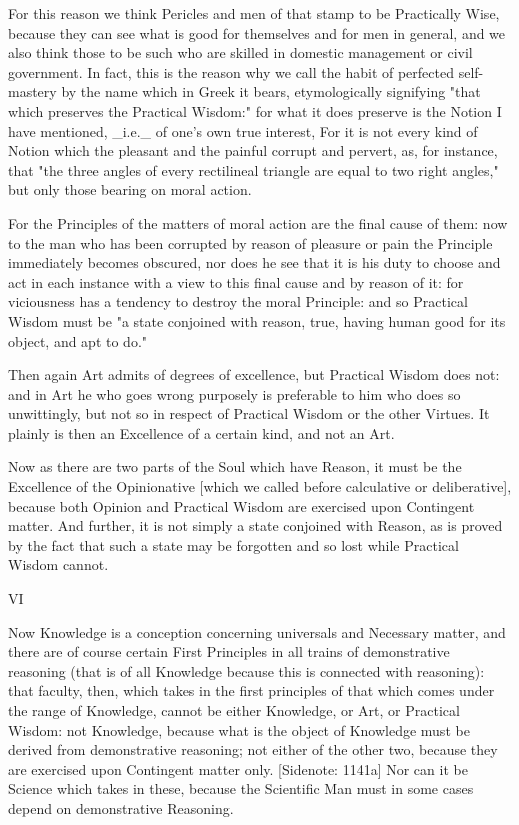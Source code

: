 For this reason we think Pericles and men of that stamp to be
Practically Wise, because they can see what is good for themselves and
for men in general, and we also think those to be such who are skilled
in domestic management or civil government. In fact, this is the reason
why we call the habit of perfected self-mastery by the name which in
Greek it bears, etymologically signifying "that which preserves the
Practical Wisdom:" for what it does preserve is the Notion I have
mentioned, _i.e._ of one's own true interest, For it is not every kind
of Notion which the pleasant and the painful corrupt and pervert, as,
for instance, that "the three angles of every rectilineal triangle are
equal to two right angles," but only those bearing on moral action.

For the Principles of the matters of moral action are the final cause
of them: now to the man who has been corrupted by reason of pleasure or
pain the Principle immediately becomes obscured, nor does he see that it
is his duty to choose and act in each instance with a view to this final
cause and by reason of it: for viciousness has a tendency to destroy the
moral Principle: and so Practical Wisdom must be "a state conjoined with
reason, true, having human good for its object, and apt to do."

Then again Art admits of degrees of excellence, but Practical Wisdom
does not: and in Art he who goes wrong purposely is preferable to him
who does so unwittingly, but not so in respect of Practical Wisdom or
the other Virtues. It plainly is then an Excellence of a certain kind,
and not an Art.

Now as there are two parts of the Soul which have Reason, it must be the
Excellence of the Opinionative [which we called before calculative or
deliberative], because both Opinion and Practical Wisdom are exercised
upon Contingent matter. And further, it is not simply a state conjoined
with Reason, as is proved by the fact that such a state may be forgotten
and so lost while Practical Wisdom cannot.

VI

Now Knowledge is a conception concerning universals and Necessary
matter, and there are of course certain First Principles in all trains
of demonstrative reasoning (that is of all Knowledge because this is
connected with reasoning): that faculty, then, which takes in the first
principles of that which comes under the range of Knowledge, cannot be
either Knowledge, or Art, or Practical Wisdom: not Knowledge, because
what is the object of Knowledge must be derived from demonstrative
reasoning; not either of the other two, because they are exercised upon
Contingent matter only. [Sidenote: 1141a] Nor can it be Science which
takes in these, because the Scientific Man must in some cases depend on
demonstrative Reasoning.

